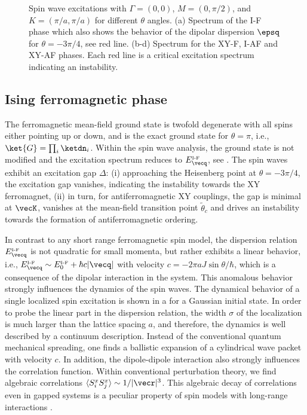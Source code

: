 \begin{figure}[ht]
    \centering
    \caption{Spin wave excitations with $\Gamma=(0,0)$, $M=(0,\pi/2)$, and $K=(\pi/a,\pi/a)$ for different $\theta$ angles. (a) Spectrum of the I-F phase which also shows the behavior of the dipolar dispersion $\epsq$ for $\theta=-3\pi/4$, see red line. (b-d) Spectrum for the XY-F, I-AF and XY-AF phases. Each red line is a critical excitation spectrum indicating an instability.}
\end{figure}



\subsection{Ising ferromagnetic phase}
The ferromagnetic mean-field ground state is twofold degenerate with all spins
either pointing up or down, and is the exact ground state for $\theta =
\pi$, i.e., $\ket{G} = \prod_{i} \ketdn_{i}$. Within the spin wave analysis,
the ground state is not modified and the excitation
spectrum reduces to $E_{{\vecq}}^{\mbox{\tiny I-F}}$, see .
The spin waves exhibit an excitation gap $\Delta$: (i) approaching the
Heisenberg point at $\theta = -3 \pi /4$, the excitation gap
vanishes, indicating the instability towards the XY ferromagnet, (ii) in
turn, for antiferromagnetic XY couplings, the gap is minimal at $\vecK$,
vanishes at the mean-field transition point $\tilde{\theta}_{c}$ and drives an instability towards the formation
of antiferromagnetic ordering.

In contrast to any short range ferromagnetic spin model, the
dispersion relation $E_{{\vecq}}^{\mbox{\tiny I-F}}$ is not quadratic for small momenta,
but rather exhibits a linear behavior, i.e., $E_{{\vecq}}^{\mbox{\tiny I-F}} \sim E_{0}^{\mbox{\tiny I-F}}+ \hbar c |{\vecq}|$ with
velocity $c= - 2 \pi a J \sin \theta /\hbar$, which is a consequence of the dipolar interaction in
the system. This anomalous behavior strongly influences the dynamics
of the spin waves.
The dynamical behavior of a single localized spin excitation is shown in a for a Gaussian initial state.
In order to probe the linear part in the dispersion relation, the width $\sigma$
of the localization is much larger than the lattice spacing $a$, and therefore, the dynamics is
well described by a continuum description.
Instead of the conventional quantum mechanical spreading, one finds
a ballistic expansion of a cylindrical wave packet with velocity $c$.
In addition, the dipole-dipole interaction also strongly influences the correlation function.
Within conventional perturbation theory, we find algebraic correlations $\langle S_{i}^{x} S_{j}^{x}\rangle \sim 1/|{\vecr}|^3$.
This algebraic decay of correlations even in gapped systems is a peculiar property of
spin models with long-range interactions \cite{Deng2005,Schuch2006}.



